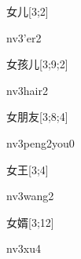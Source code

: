 \begin{verbete}[nv3'er2]{女儿}[3;2]
\begin{pronuncia}{nv3'er2}
\end{pronuncia}
\end{verbete}

\begin{verbete}[nv3hair2]{女孩儿}[3;9;2]
\begin{pronuncia}{nv3hair2}
\end{pronuncia}
\end{verbete}

\begin{verbete}{女朋友}[3;8;4]
\begin{pronuncia}{nv3peng2you0}
\end{pronuncia}
\end{verbete}

\begin{verbete}[nv3wang2]{女王}[3;4]
\begin{pronuncia}{nv3wang2}
\end{pronuncia}
\end{verbete}

\begin{verbete}[nv3xu4]{女婿}[3;12]
\begin{pronuncia}{nv3xu4}
\end{pronuncia}
\end{verbete}

